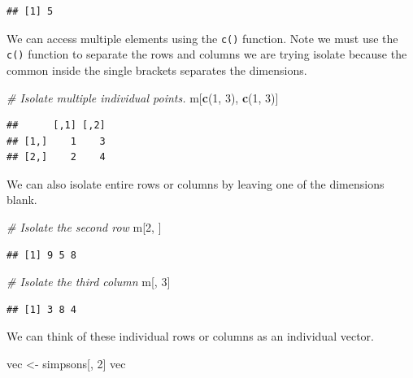 \documentclass[
]{book}
\newenvironment{Shaded}{\begin{snugshade}}{\end{snugshade}}
\newcommand{\CommentTok}[1]{\textcolor[rgb]{0.56,0.35,0.01}{\textit{#1}}}
\newcommand{\DecValTok}[1]{\textcolor[rgb]{0.00,0.00,0.81}{#1}}
\newcommand{\KeywordTok}[1]{\textcolor[rgb]{0.13,0.29,0.53}{\textbf{#1}}}
\newcommand{\NormalTok}[1]{#1}
\newcommand{\StringTok}[1]{\textcolor[rgb]{0.31,0.60,0.02}{#1}}
\begin{document}
\begin{verbatim}
## [1] 5
\end{verbatim}

We can access multiple elements using the \texttt{c()} function. Note we must use the \texttt{c()} function to separate the rows and columns we are trying isolate because the common inside the single brackets separates the dimensions.

\begin{Shaded}
\begin{Highlighting}[]
\CommentTok{# Isolate multiple individual points.}
\NormalTok{m[}\KeywordTok{c}\NormalTok{(}\DecValTok{1}\NormalTok{, }\DecValTok{3}\NormalTok{), }\KeywordTok{c}\NormalTok{(}\DecValTok{1}\NormalTok{, }\DecValTok{3}\NormalTok{)]}
\end{Highlighting}
\end{Shaded}

\begin{verbatim}
##      [,1] [,2]
## [1,]    1    3
## [2,]    2    4
\end{verbatim}

We can also isolate entire rows or columns by leaving one of the dimensions blank.

\begin{Shaded}
\begin{Highlighting}[]
\CommentTok{# Isolate the second row}
\NormalTok{m[}\DecValTok{2}\NormalTok{, ]}
\end{Highlighting}
\end{Shaded}

\begin{verbatim}
## [1] 9 5 8
\end{verbatim}

\begin{Shaded}
\begin{Highlighting}[]
\CommentTok{# Isolate the third column}
\NormalTok{m[, }\DecValTok{3}\NormalTok{]}
\end{Highlighting}
\end{Shaded}

\begin{verbatim}
## [1] 3 8 4
\end{verbatim}

We can think of these individual rows or columns as an individual vector.

\begin{Shaded}
\begin{Highlighting}[]
\NormalTok{vec <-}\StringTok{ }\NormalTok{simpsons[, }\DecValTok{2}\NormalTok{]}
\NormalTok{vec}
\end{Highlighting}
\end{Shaded}
\end{document}
